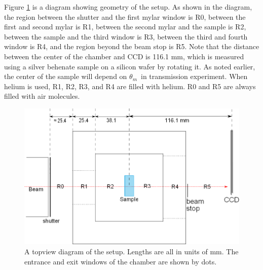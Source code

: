 \documentclass[letterpaper,12pt]{article}
\newcommand{\motor}{$\theta_m$}%
\begin{document}
Figure \ref{fig:ChamberGeometry} is a diagram showing geometry of the setup. As shown in the diagram, the region between the shutter and the first mylar window is R0, between the first and second mylar is R1, between the second mylar and the sample is R2, between the sample and the third window is R3, between the third and fourth window is R4, and the region beyond the beam stop is R5. Note that the distance between the center of the chamber and CCD is 116.1 mm, which is measured using a silver behenate sample on a silicon wafer by rotating it. As noted earlier, the center of the sample will depend on \motor\ in transmission experiment. When helium is used, R1, R2, R3, and R4 are filled with helium. R0 and R5 are always filled with air molecules.
\begin{figure}[htbp]
	\includegraphics[width=\textwidth]{ChamberGeometry}
	\caption[A topview diagram of the setup]{A topview diagram of the setup. Lengths are all in units of mm. The entrance and exit windows of the chamber are shown by dots.}
	\label{fig:ChamberGeometry}
\end{figure}
\end{document}
